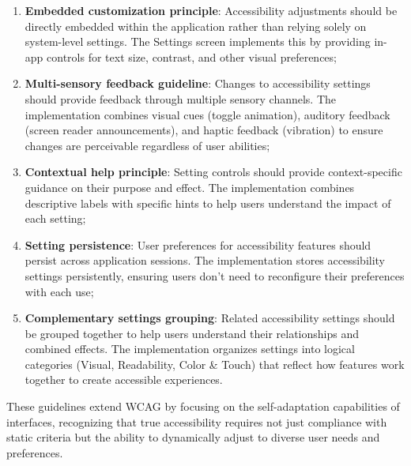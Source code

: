 \begin{enumerate}
    \item \textbf{Embedded customization principle}: Accessibility adjustments should be directly embedded within the application rather than relying solely on system-level settings. The Settings screen implements this by providing in-app controls for text size, contrast, and other visual preferences;
    
    \item \textbf{Multi-sensory feedback guideline}: Changes to accessibility settings should provide feedback through multiple sensory channels. The implementation combines visual cues (toggle animation), auditory feedback (screen reader announcements), and haptic feedback (vibration) to ensure changes are perceivable regardless of user abilities;
    
    \item \textbf{Contextual help principle}: Setting controls should provide context-specific guidance on their purpose and effect. The implementation combines descriptive labels with specific hints to help users understand the impact of each setting;
    
    \item \textbf{Setting persistence}: User preferences for accessibility features should persist across application sessions. The implementation stores accessibility settings persistently, ensuring users don't need to reconfigure their preferences with each use;
    
    \item \textbf{Complementary settings grouping}: Related accessibility settings should be grouped together to help users understand their relationships and combined effects. The implementation organizes settings into logical categories (Visual, Readability, Color \& Touch) that reflect how features work together to create accessible experiences.
\end{enumerate}

These guidelines extend WCAG by focusing on the self-adaptation capabilities of interfaces, recognizing that true accessibility requires not just compliance with static criteria but the ability to dynamically adjust to diverse user needs and preferences.

\newpage